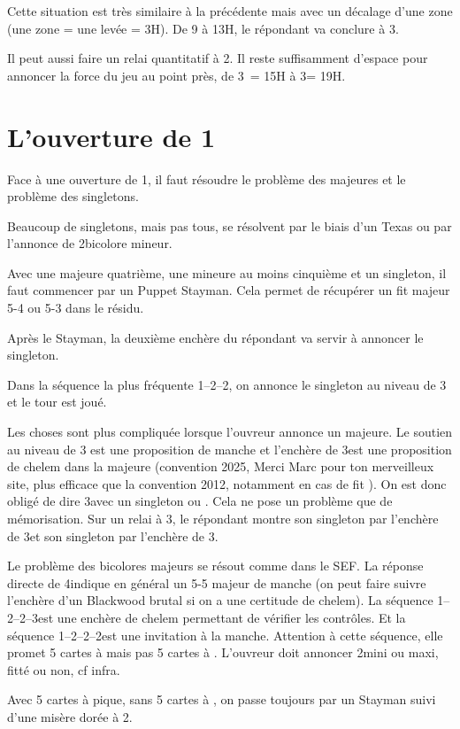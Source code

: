\documentclass[a4paper,12pt, french]{article}
\newcommand{\T}{\Cl}
\newcommand{\K}{\Di}
\newcommand{\C}{\He}
\renewcommand{\P}{\Sp}
\begin{document}
Cette situation est très similaire à la précédente mais avec un décalage d'une zone (une zone = une levée = 3H). De 9 à 13H, le répondant va conclure à 3\NT.

Il peut aussi faire un relai quantitatif à 2\NT. Il reste suffisamment d'espace pour annoncer la force du jeu au point près, de 3\T\ = 15H à 3\NT = 19H. 


\section{L'ouverture de 1\NT}

Face à une ouverture de 1\NT, il faut résoudre le problème des majeures et le problème des singletons.

Beaucoup de singletons, mais pas tous, se résolvent par le biais d'un Texas ou par l'annonce de 2\NT bicolore mineur.

Avec une majeure quatrième, une mineure au moins cinquième et un singleton, il faut commencer par un Puppet Stayman. Cela permet de récupérer un fit majeur 5-4 ou 5-3 dans le résidu. 

Après le Stayman, la deuxième enchère du répondant va servir à annoncer le singleton.

Dans la séquence la plus fréquente 1\NT--2\T--2\K, on annonce le singleton au niveau de 3 et le tour est joué.

Les choses sont plus compliquée lorsque l'ouvreur annonce un majeure. Le soutien au niveau de 3 est une proposition de manche et l'enchère de 3\K est une proposition de chelem dans la majeure (convention 2025, Merci Marc pour ton merveilleux site, plus efficace que la convention 2012, notamment en cas de fit \C).
On est donc obligé de dire 3\T avec un singleton \T ou \K. Cela ne pose un problème que de mémorisation. Sur un relai à 3\K, le répondant montre son singleton \T par l'enchère de 3\C et son singleton \K par l'enchère de 3\P.

Le  problème des bicolores majeurs se résout comme dans le SEF. La réponse directe de 4\K indique en général un  5-5 majeur de manche (on peut faire suivre l'enchère d'un Blackwood brutal si on a une certitude de chelem). La séquence 1\NT--2\C--2\P--3\C est une enchère de chelem permettant de vérifier les contrôles. 
Et la séquence 1\NT--2\K--2\C--2\P est une invitation à la manche. Attention à cette séquence, elle promet 5 cartes à \C mais pas 5 cartes à \P. L'ouvreur doit annoncer 2\NT mini ou maxi, fitté ou non, cf infra.

Avec 5 cartes à pique, sans 5 cartes à \C, on passe toujours par un Stayman suivi d'une misère dorée à 2\P.
\end{document}
